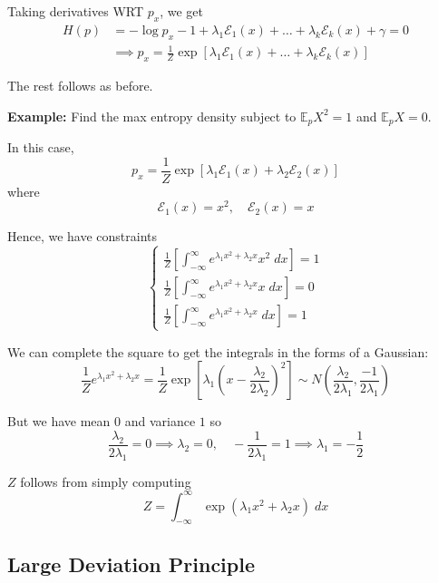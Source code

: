 \documentclass[12pt]{article}
\newcommand{\E}{\mathbb{E}}
\newcommand{\Ec}{\mathcal{E}}
\newcommand*{\tbf}[1]{\ifmmode\mathbf{#1}\else\textbf{#1}\fi}
\begin{document}
Taking derivatives WRT $p_x$, we get
\begin{align*}
    H(p) & = -\log p_x - 1 + \lambda_1 \Ec_1(x) + \dots + \lambda_k \Ec_k(x) + \gamma = 0              \\
         & \implies p_x = \frac{1}{Z} \exp\left[\lambda_1 \Ec_1(x) + \dots + \lambda_k \Ec_k(x)\right]
\end{align*}

The rest follows as before.

\tbf{Example:} Find the max entropy density subject to $\E_p X^2 = 1$ and $\E_p X = 0$.

In this case,
\[p_x = \frac{1}{Z} \exp\left[\lambda_1 \Ec_1(x) + \lambda_2 \Ec_2(x)\right]\]
where
\[\Ec_1(x) = x^2, \quad \Ec_2(x) = x\]

Hence, we have constraints
\[\begin{cases}
        \frac{1}{Z} \left[\int_{-\infty}^{\infty} e^{\lambda_1 x^2 + \lambda_2 x} x^2\; dx\right] = 1 \\
        \frac{1}{Z} \left[\int_{-\infty}^{\infty} e^{\lambda_1 x^2 + \lambda_2 x} x\; dx\right] = 0   \\
        \frac{1}{Z} \left[\int_{-\infty}^{\infty} e^{\lambda_1 x^2 + \lambda_2 x}\; dx\right] = 1
    \end{cases}\]

We can complete the square to get the integrals in the forms of a Gaussian:
\[\frac{1}{Z}e^{\lambda_1 x^2  +\lambda_2 x} = \frac{1}{Z}\exp\left[\lambda_1 \left(x - \frac{\lambda_2}{2\lambda_2}\right)^2 \right] \sim N(\frac{\lambda_2}{2\lambda_1}, \frac{-1}{2\lambda_1})\]

But we have mean $0$ and variance $1$ so
\[\frac{\lambda_2}{2\lambda_1} = 0 \implies \lambda_2 = 0, \quad -\frac{1}{2\lambda_1} = 1 \implies \lambda_1 = -\frac{1}{2}\]

$Z$ follows from simply computing
\[Z = \int_{-\infty}^{\infty} \exp(\lambda_1 x^2 + \lambda_2 x)\; dx\]

\subsection{Large Deviation Principle}
\end{document}
